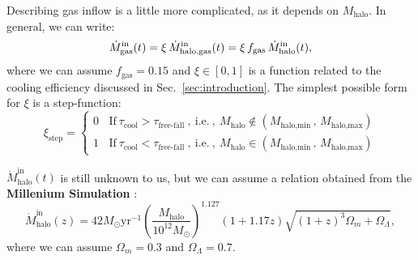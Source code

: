\documentclass[fleqn,usenatbib]{mnras}
\begin{document}
Describing gas inflow is a little more complicated, as it depends on $M_\text{halo}$. In general, we can write:
\begin{equation}
    \dot{M}_\text{gas}^\text{in}(t) = \xi \, \dot{M}_\text{halo,\rm gas}^\text{in}(t) = \xi \, f_\text{gas} \, \dot{M}_\text{halo}^\text{in}(t),
	\label{eq:mgas_inflow}
\end{equation}
where we can assume $f_\text{gas}=0.15$ and $\xi \in [0,1]$ is a function related to the cooling efficiency discussed in Sec.~\ref{sec:introduction}. The simplest possible form for $\xi$ is a step-function:
{\fontsize{7.9pt}{7.9pt}\begin{equation}
    \xi_\text{step} =
    \begin{cases}
        0 \:\:\:\: \text{If} \: \tau_\text{cool} > \tau_\text{free-fall} \: , \: \text{i.e.} \: , \: M_{\text{halo}} \notin \left( M_{\text{halo,min}} \, , \, M_{\text{halo,max}} \right)\\
        1 \:\:\:\: \text{If} \: \tau_\text{cool} < \tau_\text{free-fall} \: , \: \text{i.e.} \: , \: M_{\text{halo}} \in \left( M_{\text{halo,min}} \, , \, M_{\text{halo,max}} \right)
    \end{cases}
	\label{eq:xi_step}
\end{equation}}

$\dot{M}_\text{halo}^\text{in}(t)$ is still unknown to us, but we can assume a relation obtained from the \textbf{Millenium Simulation} \citep{McBride_2009}:
{\fontsize{7.9pt}{7.9pt}\begin{equation}
    \dot{M}_\text{halo}^\text{in}(z) = 42 M_{\odot} \text{yr}^{-1} \left(\dfrac{M_\text{halo}}{10^{12}M_{\odot}}\right)^{1.127} (1+1.17z) \sqrt{(1+z)^3 \Omega_m + \Omega_\Lambda},
	\label{eq:mcbride}
\end{equation}}
where we can assume $\Omega_m=0.3$ and $\Omega_\Lambda=0.7$.
\end{document}
